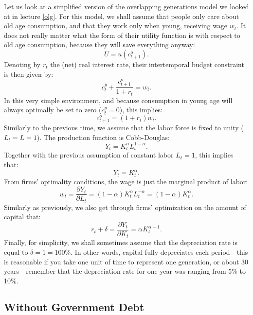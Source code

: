 \documentclass[]{book}
\theoremstyle{definition}
\theoremstyle{definition}
\theoremstyle{definition}
\theoremstyle{remark}
\begin{document}
Let us look at a simplified version of the overlapping generations model
we looked at in lecture \ref{olg}. For this model, we shall assume that
people only care about old age consumption, and that they work only when
young, receiving wage \(w_{t}\). It does not really matter what the form
of their utility function is with respect to old age consumption,
because they will save everything anyway: \[U=u(c_{t+1}^{o}).\] Denoting
by \(r_t\) the (net) real interest rate, their intertemporal budget
constraint is then given by:
\[c_{t}^{y}+\frac{c_{t+1}^{o}}{1+r_t}=w_{t}.\] In this very simple
environment, and because consumption in young age will always optimally
be set to zero (\(c_{t}^{y}=0\)), this implies:
\[c_{t+1}^{o}=(1+r_t)w_{t}.\] Similarly to the previous time, we assume
that the labor force is fixed to unity (\(L_{t}=\bar{L}=1\)). The
production function is Cobb-Douglas:
\[Y_{t}=K_{t}^{\alpha}L_{t}^{1-\alpha}.\] Together with the previous
assumption of constant labor \(L_{t}=1\), this implies that:
\[Y_{t}=K_{t}^{\alpha}.\] From firms' optimality conditions, the wage is
just the marginal product of labor:
\[w_{t}=\frac{\partial Y_{t}}{\partial L_{t}}=(1-\alpha)K_{t}^{\alpha}L_{t}^{-\alpha}=(1-\alpha)K_{t}^{\alpha}.\]
Similarly as previously, we also get through firms' optimization on the
amount of capital that:
\[r_t+\delta=\frac{\partial Y_{t}}{\partial K_{t}}=\alpha K_{t}^{\alpha-1}.\]
Finally, for simplicity, we shall sometimes assume that the depreciation
rate is equal to \(\delta=1=100\%\). In other words, capital fully
depreciates each period - this is reasonable if you take one unit of
time to represent one generation, or about 30 years - remember that the
depreciation rate for one year was ranging from 5\% to 10\%.

\subsection{Without Government Debt}\label{without-government-debt}
\end{document}
